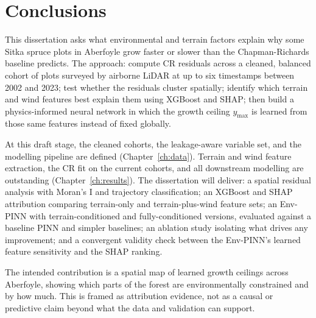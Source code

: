 \chapter{Conclusions}
\label{ch:conclusion}

This dissertation asks what environmental and terrain factors explain why some Sitka spruce plots in Aberfoyle grow faster or slower than the Chapman-Richards baseline predicts. The approach: compute CR residuals across a cleaned, balanced cohort of plots surveyed by airborne LiDAR at up to six timestamps between 2002 and 2023; test whether the residuals cluster spatially; identify which terrain and wind features best explain them using XGBoost and SHAP; then build a physics-informed neural network in which the growth ceiling $y_{\max}$ is learned from those same features instead of fixed globally.

At this draft stage, the cleaned cohorts, the leakage-aware variable set, and the modelling pipeline are defined (Chapter~\ref{ch:data}). Terrain and wind feature extraction, the CR fit on the current cohorts, and all downstream modelling are outstanding (Chapter~\ref{ch:results}). The dissertation will deliver: a spatial residual analysis with Moran's I and trajectory classification; an XGBoost and SHAP attribution comparing terrain-only and terrain-plus-wind feature sets; an Env-PINN with terrain-conditioned and fully-conditioned versions, evaluated against a baseline PINN and simpler baselines; an ablation study isolating what drives any improvement; and a convergent validity check between the Env-PINN's learned feature sensitivity and the SHAP ranking.

The intended contribution is a spatial map of learned growth ceilings across Aberfoyle, showing which parts of the forest are environmentally constrained and by how much. This is framed as attribution evidence, not as a causal or predictive claim beyond what the data and validation can support.
